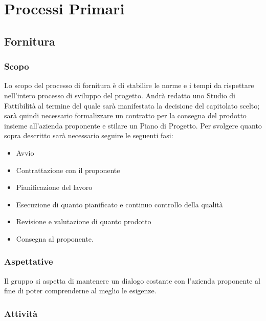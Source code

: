 \section{Processi Primari}

\subsection{Fornitura}
\subsubsection{Scopo}
Lo scopo del processo di fornitura è di stabilire le norme e i tempi da rispettare nell'intero processo di sviluppo del progetto.
Andrà redatto uno Studio di Fattibilità al termine del quale sarà manifestata la decisione del capitolato scelto; sarà quindi necessario formalizzare un contratto per la consegna del prodotto insieme all'azienda proponente e stilare un Piano di Progetto. 
Per svolgere quanto sopra descritto sarà necessario seguire le seguenti fasi:
\begin{itemize}
	\item Avvio
	\item Contrattazione con il proponente
	\item Pianificazione del lavoro
	\item Esecuzione di quanto pianificato e continuo controllo della qualità
	\item Revisione e valutazione di quanto prodotto
	\item Consegna al proponente.
\end{itemize}
\subsubsection{Aspettative}
Il gruppo si aspetta di mantenere un dialogo costante con l'azienda proponente al fine di poter comprenderne al meglio le esigenze.
\subsubsection{Attività}
